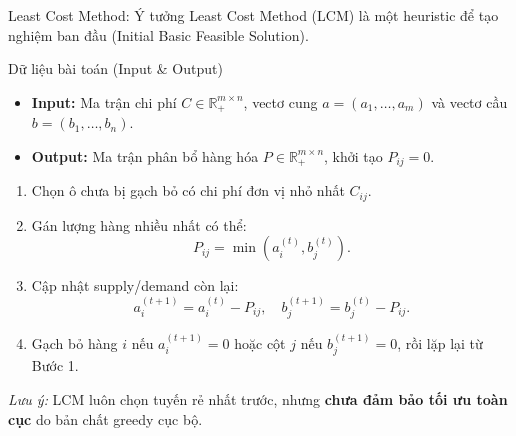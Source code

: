 \documentclass[10pt]{beamer}
\begin{document}
\begin{frame}{Least Cost Method: Ý tưởng}
    \small
    Least Cost Method (LCM) là một heuristic để tạo nghiệm ban đầu (Initial Basic Feasible Solution).

    \begin{block}{Dữ liệu bài toán (Input \& Output)}
        \begin{itemize}
            \item \textbf{Input:} Ma trận chi phí $C \in \mathbb{R}^{m \times n}_+$, vectơ cung $a=(a_1,\dots,a_m)$ và vectơ cầu $b=(b_1,\dots,b_n)$.
            \item \textbf{Output:} Ma trận phân bổ hàng hóa $P \in \mathbb{R}^{m \times n}_+$, khởi tạo $P_{ij}=0$.
        \end{itemize}
    \end{block}

    \begin{enumerate}
        \item Chọn ô chưa bị gạch bỏ có chi phí đơn vị nhỏ nhất $C_{ij}$.
        \item Gán lượng hàng nhiều nhất có thể:
        \[
            P_{ij}=\min\left(a_i^{(t)}, b_j^{(t)}\right).
        \]
        \item Cập nhật supply/demand còn lại:
        \[
            a_i^{(t+1)}=a_i^{(t)}-P_{ij},\quad
            b_j^{(t+1)}=b_j^{(t)}-P_{ij}.
        \]
        \item Gạch bỏ hàng $i$ nếu $a_i^{(t+1)}=0$ hoặc cột $j$ nếu $b_j^{(t+1)}=0$, rồi lặp lại từ Bước 1.
    \end{enumerate}

    \vskip 0.1cm
    \textit{Lưu ý:} LCM luôn chọn tuyến rẻ nhất trước, nhưng \textbf{chưa đảm bảo tối ưu toàn cục} do bản chất greedy cục bộ.
\end{frame}
\end{document}
